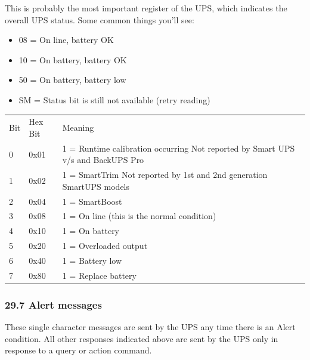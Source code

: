 {{{{{{{{{{{{{{{{{This is probably the most important register of the UPS, which indicates the
overall UPS status. Some common things you'll see:  

\begin{itemize}
\item 08 = On line, battery OK  
\item 10 = On battery, battery OK  
\item 50 = On battery, battery low  
\item SM = Status bit is still not available (retry reading) 
\end{itemize}

\begin{longtable}{p{0.5in}p{0.5in}p{4in}}
{Bit} & {Hex Bit} & {Meaning 
 } \\
{0} & {0x01} & {1 = Runtime calibration occurring Not reported by Smart UPS
v/s and BackUPS Pro 
 } \\
{1} & {0x02} & {1 = SmartTrim Not reported by 1st and 2nd generation SmartUPS
models 
 } \\
{2} & {0x04} & {1 = SmartBoost 
 } \\
{3} & {0x08} & {1 = On line (this is the normal condition) 
 } \\
{4} & {0x10} & {1 = On battery 
 } \\
{5} & {0x20} & {1 = Overloaded output 
 } \\
{6} & {0x40} & {1 = Battery low 
 } \\
{7} & {0x80} & {1 = Replace battery  
}

\end{longtable}

\label{Alert-messages}

\subsubsection*{29.7 Alert messages}

These single character messages are sent by the UPS any time there is an Alert
condition. All other responses indicated above are sent by the UPS only in
response to a query or action command.  

}}}}}}}}}}}}}}}}}
